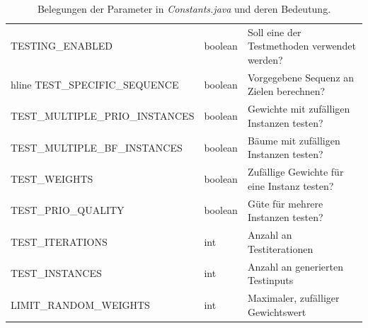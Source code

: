 \documentclass{scrartcl}
\begin{document}
\begin{table}[htpb]
{\begin{tabular}{>{\scriptsize}lll}
TESTING\_ENABLED & boolean                & Soll eine der Testmethoden verwendet werden? \\hline
TEST\_SPECIFIC\_SEQUENCE & boolean        & Vorgegebene Sequenz an Zielen berechnen?\\ \hline
TEST\_MULTIPLE\_PRIO\_INSTANCES & boolean & Gewichte mit zufälligen Instanzen testen?\\ \hline
TEST\_MULTIPLE\_BF\_INSTANCES & boolean   & Bäume mit zufälligen Instanzen testen? \\ \hline 
TEST\_WEIGHTS & boolean                   & Zufällige Gewichte für eine Instanz testen? \\ \hline
TEST\_PRIO\_QUALITY & boolean             & Güte für mehrere Instanzen testen? \\ \hline
TEST\_ITERATIONS  & int                   & Anzahl an Testiterationen \\ \hline
TEST\_INSTANCES & int                     & Anzahl an generierten Testinputs \\ \hline
LIMIT\_RANDOM\_WEIGHTS & int              & Maximaler, zufälliger Gewichtswert \\ \hline
\end{tabular}}
\caption{Belegungen der Parameter in \emph{Constants.java} und deren Bedeutung.}
\label{Constants}
\end{table}
\end{document}
